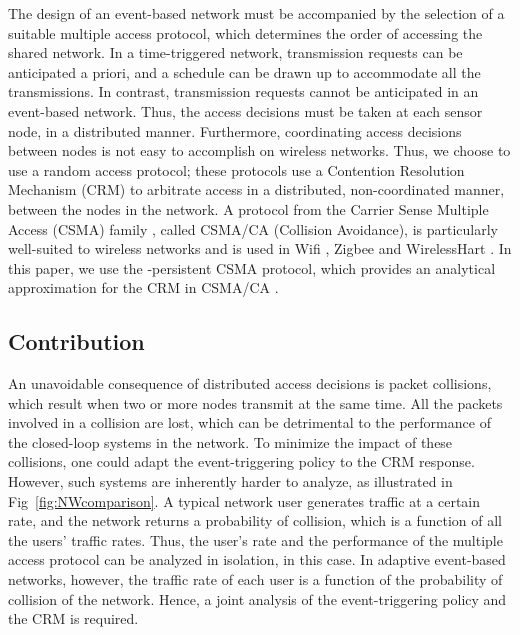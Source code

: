\documentclass[journal]{IEEEtran}
\begin{document}
The design of an event-based network must be accompanied by the selection of a suitable multiple access protocol, which determines the order of accessing the shared network. In a time-triggered network, transmission requests can be anticipated a priori, and a schedule can be drawn up to accommodate all the transmissions. In contrast, transmission requests cannot be anticipated in an event-based network. Thus, the access decisions must be taken at each sensor node, in a distributed manner. Furthermore, coordinating access decisions between nodes is not easy to accomplish on wireless networks. Thus, we choose to use a random access protocol; these protocols use a Contention Resolution Mechanism (CRM) to arbitrate access in a distributed, non-coordinated manner, between the nodes in the network. A protocol from the Carrier Sense Multiple Access (CSMA) family \cite{Rom1990}, called CSMA/CA (Collision Avoidance), is particularly well-suited to wireless networks and is used in Wifi \cite{ieee80211}, Zigbee \cite{zigbee} and WirelessHart \cite{WirelessHART2007}. In this paper, we use the -persistent CSMA protocol, which provides an analytical approximation for the CRM in CSMA/CA \cite{Kleinrock1975}.

\subsection{Contribution}

An unavoidable consequence of distributed access decisions is packet collisions, which result when two or more nodes transmit at the same time. All the packets involved in a collision are lost, which can be detrimental to the performance of the closed-loop systems in the network. To minimize the impact of these collisions, one could adapt the event-triggering policy to the CRM response. However, such systems are inherently harder to analyze, as illustrated in Fig~\ref{fig:NWcomparison}. A typical network user generates traffic at a certain rate, and the network returns a probability of collision, which is a function of all the users' traffic rates. Thus, the user's rate and the performance of the multiple access protocol can be analyzed in isolation, in this case. In adaptive event-based networks, however, the traffic rate of each user is a function of the probability of collision of the network. Hence, a joint analysis of the event-triggering policy and the CRM is required.
\end{document}
